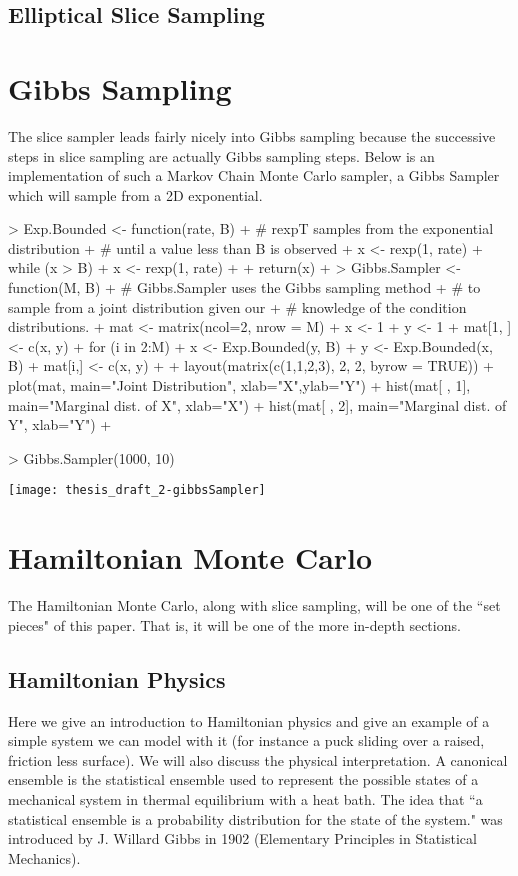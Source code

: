 \documentclass[11pt, a4paper]{article}
\theoremstyle{plain}
\theoremstyle{definition}
\begin{document}
\subsection{Elliptical Slice Sampling}

\section{Gibbs Sampling}
The slice sampler leads fairly nicely into Gibbs sampling because
the successive steps in slice sampling are actually
Gibbs sampling steps. 
Below is an implementation of such a Markov Chain Monte Carlo sampler, a Gibbs 
Sampler which will sample from a 2D exponential.
\begin{Schunk}
\begin{Sinput}
> Exp.Bounded <- function(rate, B) {
+   # rexpT samples from the exponential distribution
+   # until a value less than B is observed
+   x <- rexp(1, rate)
+   while (x > B) {
+     x <- rexp(1, rate)
+   }
+   return(x)
+ }
> Gibbs.Sampler <- function(M, B) {
+   # Gibbs.Sampler uses the Gibbs sampling method
+   # to sample from a joint distribution given our
+   # knowledge of the condition distributions.
+   mat <- matrix(ncol=2, nrow = M)
+   x <- 1
+   y <- 1
+   mat[1, ] <- c(x, y)
+   for (i in 2:M) {
+       x <- Exp.Bounded(y, B)
+       y <- Exp.Bounded(x, B)
+       mat[i,] <- c(x, y)
+   }
+   layout(matrix(c(1,1,2,3), 2, 2, byrow = TRUE))
+   plot(mat, main="Joint Distribution", xlab="X",ylab="Y")
+   hist(mat[ , 1], main="Marginal dist. of X", xlab="X")
+   hist(mat[ , 2], main="Marginal dist. of Y", xlab="Y")
+ }
\end{Sinput}
\end{Schunk}
\begin{Schunk}
\begin{Sinput}
> Gibbs.Sampler(1000, 10)
\end{Sinput}
\end{Schunk}
\texttt{[image: thesis\_draft\_2-gibbsSampler]}

\section{Hamiltonian Monte Carlo}
The Hamiltonian Monte Carlo, along with slice sampling, will be one of the ``set
pieces" of this paper. That is, it will be one of the more in-depth sections.
\subsection{Hamiltonian Physics}
Here we give an introduction to Hamiltonian physics and give an example
of a simple system we can model with it (for instance a puck sliding over a
raised, friction less surface). We will also discuss the physical interpretation. 
A canonical ensemble is the statistical ensemble used to represent the possible
states of a mechanical system in thermal equilibrium with a heat bath. The 
idea that ``a statistical ensemble is a probability distribution for the state 
of the system." was introduced by J. Willard Gibbs in 1902 (Elementary Principles in Statistical Mechanics).
\end{document}
